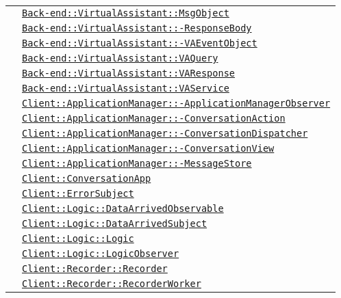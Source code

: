 \begin{longtable}{|>{\centering}m{3cm}|m{10cm}<{\centering}|}
& \hyperref[Back-end::VirtualAssistant::MsgObject]{\texttt{Back-end::VirtualAssistant::MsgObject}}\\
& \hyperref[Back-end::VirtualAssistant::ResponseBody]{\texttt{Back-end::VirtualAssistant::-\linebreak ResponseBody}}\\
& \hyperref[Back-end::VirtualAssistant::VAEventObject]{\texttt{Back-end::VirtualAssistant::-\linebreak VAEventObject}}\\
& \hyperref[Back-end::VirtualAssistant::VAQuery]{\texttt{Back-end::VirtualAssistant::VAQuery}}\\
& \hyperref[Back-end::VirtualAssistant::VAResponse]{\texttt{Back-end::VirtualAssistant::VAResponse}}\\
& \hyperref[Back-end::VirtualAssistant::VAService]{\texttt{Back-end::VirtualAssistant::VAService}}\\
& \hyperref[Client::ApplicationManager::ApplicationManagerObserver]{\texttt{Client::ApplicationManager::-\linebreak ApplicationManagerObserver}}\\
& \hyperref[Client::ApplicationManager::ConversationAction]{\texttt{Client::ApplicationManager::-\linebreak ConversationAction}}\\
& \hyperref[Client::ApplicationManager::ConversationDispatcher]{\texttt{Client::ApplicationManager::-\linebreak ConversationDispatcher}}\\
& \hyperref[Client::ApplicationManager::ConversationView]{\texttt{Client::ApplicationManager::-\linebreak ConversationView}}\\
& \hyperref[Client::ApplicationManager::MessageStore]{\texttt{Client::ApplicationManager::-\linebreak MessageStore}}\\
& \hyperref[Client::ConversationApp]{\texttt{Client::ConversationApp}}\\
& \hyperref[Client::ErrorSubject]{\texttt{Client::ErrorSubject}}\\
& \hyperref[Client::Logic::DataArrivedObservable]{\texttt{Client::Logic::DataArrivedObservable}}\\
& \hyperref[Client::Logic::DataArrivedSubject]{\texttt{Client::Logic::DataArrivedSubject}}\\
& \hyperref[Client::Logic::Logic]{\texttt{Client::Logic::Logic}}\\
& \hyperref[Client::Logic::LogicObserver]{\texttt{Client::Logic::LogicObserver}}\\
& \hyperref[Client::Recorder::Recorder]{\texttt{Client::Recorder::Recorder}}\\
& \hyperref[Client::Recorder::RecorderWorker]{\texttt{Client::Recorder::RecorderWorker}}\\ \hline


\end{longtable}
